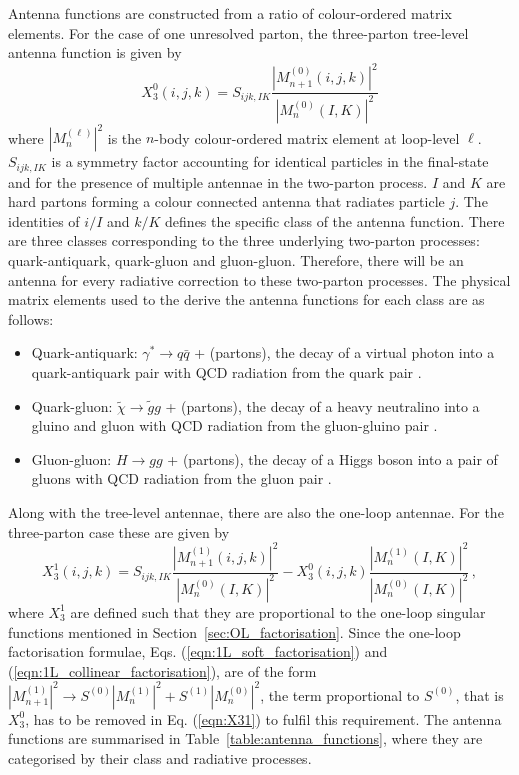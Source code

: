 \documentclass[main.tex]{subfiles}
\begin{document}
    Antenna functions are constructed from a ratio of
    colour-ordered matrix elements.
    For the case of one unresolved parton, the three-parton
    tree-level antenna function is given by
    \begin{equation}\label{eqn:X30}
        X_{3}^{0}(i, j, k) = S_{ijk,IK} \dfrac{|M_{n+1}^{(0)}(i,j,k)|^{2}}{|M_{n}^{(0)}(I,K)|^{2}}
    \end{equation}
    where $|M_{n}^{(\ell)}|^{2}$ is the $n$-body colour-ordered matrix
    element at loop-level $\ell$. $S_{ijk,IK}$ is a symmetry factor
    accounting for identical particles in the final-state
    and for the presence of multiple antennae in the two-parton process.
    $I$ and $K$ are hard partons forming a colour
    connected antenna that radiates particle $j$. The identities
    of $i/I$ and $k/K$ defines the specific class of the
    antenna function. There are three classes corresponding
    to the three underlying two-parton processes: quark-antiquark,
    quark-gluon and gluon-gluon. Therefore, there will
    be an antenna for every radiative correction to these
    two-parton processes. The physical matrix elements used
    to the derive the antenna functions for each class are as follows:
    \begin{itemize}
        \item Quark-antiquark: $\gamma^{*} \rightarrow q\bar{q}$ + (partons),
        the decay of a virtual photon into a quark-antiquark pair with QCD radiation from the quark pair \cite{Gehrmann-DeRidder:2004ttg}.
        \item Quark-gluon: $\tilde{\chi} \rightarrow \tilde{g}g$ + (partons),
        the decay of a heavy neutralino into a gluino and gluon with QCD radiation from the gluon-gluino pair \cite{Gehrmann-DeRidder:2005svg}.
        \item Gluon-gluon: $H \rightarrow gg$ + (partons),
        the decay of a Higgs boson into a pair of gluons with QCD radiation from the gluon pair \cite{Gehrmann-DeRidder:2005alt}.
    \end{itemize}
    Along with the tree-level antennae, there are also the
    one-loop antennae. For the three-parton case these are given by
    \begin{equation}\label{eqn:X31}
        X_{3}^{1}(i,j,k) = S_{ijk,IK} \dfrac{|M_{n+1}^{(1)}(i,j,k)|^{2}}{|M_{n}^{(0)}(I,K)|^{2}} - X_{3}^{0}(i,j,k) \dfrac{|M_{n}^{(1)}(I,K)|^{2}}{|M_{n}^{(0)}(I,K)|^{2}} \, ,
    \end{equation}
    where $X_{3}^{1}$ are defined such that they are proportional
    to the one-loop singular functions mentioned in Section~\ref{sec:OL_factorisation}.
    Since the one-loop factorisation formulae, Eqs. (\ref{eqn:1L_soft_factorisation})
    and (\ref{eqn:1L_collinear_factorisation}), are of the form
    $|M^{(1)}_{n+1}|^{2}\rightarrow S^{(0)}|M^{(1)}_{n}|^{2} + S^{(1)}|M^{(0)}_{n}|^{2}$,
    the term proportional to $S^{(0)}$, that is $X_{3}^{0}$, has to be removed
    in Eq. (\ref{eqn:X31}) to fulfil this requirement.
    The antenna functions are summarised in Table~\ref{table:antenna_functions},
    where they are categorised by their class and radiative
    processes.
\end{document}
